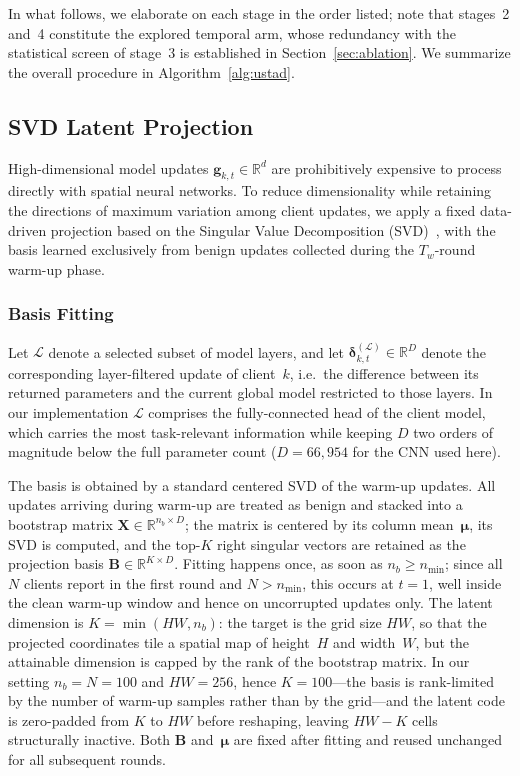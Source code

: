\documentclass[journal]{IEEEtran}
\begin{document}
In what follows, we elaborate on each stage in the order listed; note that stages~2 and~4 constitute the explored temporal arm, whose redundancy with the statistical screen of stage~3 is established in Section~\ref{sec:ablation}. We summarize the overall procedure in Algorithm~\ref{alg:ustad}.

\subsection{SVD Latent Projection}
\label{sec:svd_projection}

High-dimensional model updates $\mathbf{g}_{k,t} \in \mathbb{R}^d$ are prohibitively expensive to process directly with spatial neural networks. To reduce dimensionality while retaining the directions of maximum variation among client updates, we apply a fixed data-driven projection based on the Singular Value Decomposition (SVD)~\cite{zhang2015singular}, with the basis learned exclusively from benign updates collected during the $T_w$-round warm-up phase.

\subsubsection{Basis Fitting}
Let $\mathcal{L}$ denote a selected subset of model layers, and let $\boldsymbol{\delta}_{k,t}^{(\mathcal{L})} \in \mathbb{R}^{D}$ denote the corresponding layer-filtered update of client~$k$, i.e.\ the difference between its returned parameters and the current global model restricted to those layers. In our implementation $\mathcal{L}$ comprises the fully-connected head of the client model, which carries the most task-relevant information while keeping $D$ two orders of magnitude below the full parameter count ($D = 66{,}954$ for the CNN used here).

The basis is obtained by a standard centered SVD of the warm-up updates. All updates arriving during warm-up are treated as benign and stacked into a bootstrap matrix $\mathbf{X} \in \mathbb{R}^{n_b \times D}$; the matrix is centered by its column mean~$\boldsymbol{\mu}$, its SVD is computed, and the top-$K$ right singular vectors are retained as the projection basis $\mathbf{B} \in \mathbb{R}^{K \times D}$. Fitting happens once, as soon as $n_b \geq n_{\min}$; since all $N$ clients report in the first round and $N > n_{\min}$, this occurs at $t = 1$, well inside the clean warm-up window and hence on uncorrupted updates only. The latent dimension is $K = \min(HW, n_b)$: the target is the grid size $HW$, so that the projected coordinates tile a spatial map of height~$H$ and width~$W$, but the attainable dimension is capped by the rank of the bootstrap matrix. In our setting $n_b = N = 100$ and $HW = 256$, hence $K = 100$---the basis is rank-limited by the number of warm-up samples rather than by the grid---and the latent code is zero-padded from $K$ to $HW$ before reshaping, leaving $HW - K$ cells structurally inactive. Both $\mathbf{B}$ and~$\boldsymbol{\mu}$ are fixed after fitting and reused unchanged for all subsequent rounds.
\end{document}
